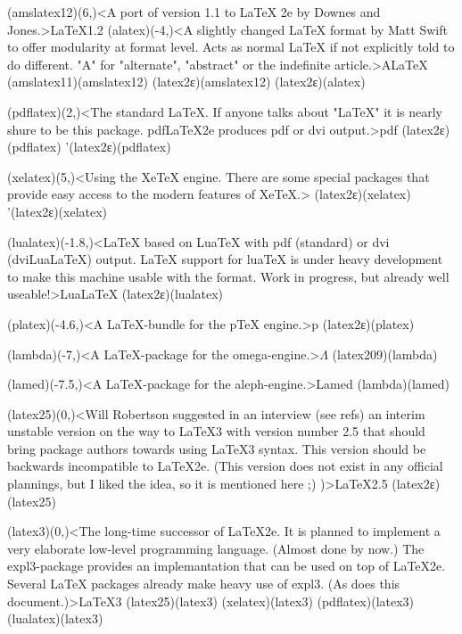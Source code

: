 \documentclass[
%
]{scrartcl}
\begin{document}
{	\tonode(amslatex12)(6,\layer)<A port of version 1.1 to LaTeX 2e by Downes and Jones.>{\AMS\LaTeX 1.2}
	\tonode[\experimental](alatex)(-4,\layer)<A slightly changed LaTeX format by Matt Swift to offer modularity at format level. Acts as normal LaTeX if not explicitly told to do different. "A" for "alternate", "abstract" or the indefinite article.>{A\LaTeX}
	\todraw(amslatex11)(amslatex12)
	\todraw(latex2ε)(amslatex12)
	\todraw(latex2ε)(alatex)
	\steplayer[-1.5]

	\tonode[\vip](pdflatex)(2,\layer)<The standard LaTeX. If anyone talks about "LaTeX" it is nearly shure to be this package. pdfLaTeX2e produces pdf or dvi output.>{pdf\LaTeXe}
	\todraw(latex2ε)(pdflatex)
	\todraw'(latex2ε)(pdflatex)
	
	\tonode[\vip](xelatex)(5,\layer)<Using the XeTeX engine. There are some special packages that provide easy access to the modern features of XeTeX.>{\XeLaTeX}
	\todraw(latex2ε)(xelatex)
	\todraw'(latex2ε)(xelatex)
	
	\tonode(lualatex)(-1.8,\layer)<LaTeX based on LuaTeX with pdf (standard) or dvi (dviLuaLaTeX) output. LaTeX support for luaTeX is under heavy development to make this machine usable with the format. Work in progress, but already well useable!>{Lua\LaTeX}
	\todraw(latex2ε)(lualatex)
	
	\tonode(platex)(-4.6,\layer)<A LaTeX-bundle for the pTeX engine.>{p\LaTeXe}
	\todraw(latex2ε)(platex)

	\tonode[\experimental](lambda)(-7,\layer)<A LaTeX-package for the omega-engine.>{$\Lambda$}
	\todraw(latex209)(lambda)
	\steplayer[-1.5]

	\tonode[\experimental](lamed)(-7.5,\layer)<A LaTeX-package for the aleph-engine.>{Lamed}
	\todraw(lambda)(lamed)
	
	\steplayer[-1]
	\tonode[\experimental](latex25)(0,\layer)<Will Robertson suggested in an interview (see refs) an interim unstable version on the way to LaTeX3 with version number 2.5 that should bring package authors towards using LaTeX3 syntax. This version should be backwards incompatible to LaTeX2e. (This version does not exist in any official plannings, but I liked the idea, so it is mentioned here ;) )>{\LaTeX2.5}
	\todraw(latex2ε)(latex25)
	
	\steplayer[-3]
	\tonode[\experimental](latex3)(0,\layer)<The long-time successor of LaTeX2e. It is planned to implement a very elaborate low-level programming language. (Almost done by now.) The expl3-package provides an implemantation that can be used on top of LaTeX2e. Several LaTeX packages already make heavy use of expl3. (As does this document.)>{\LaTeX{}3}
	\todraw(latex25)(latex3)
	\todraw[dotted](xelatex)(latex3)
	\todraw[dotted](pdflatex)(latex3)
	\todraw[dotted](lualatex)(latex3)
}
\end{document}
